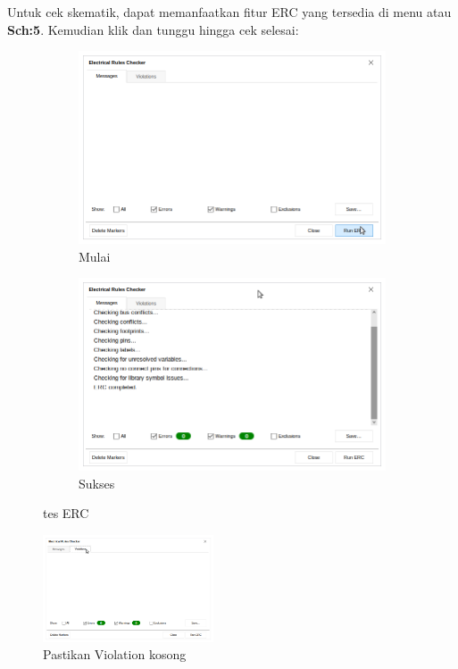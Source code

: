 \documentclass[12pt]{book}
\begin{document}
	Untuk cek skematik, dapat memanfaatkan fitur ERC yang tersedia di menu  atau \textbf{Sch:5}.
	Kemudian klik  dan tunggu hingga cek selesai:
	\begin{figure}[!ht]
		\centering
		\begin{subfigure}[t]{0.45\textwidth}
			\includegraphics[width=\textwidth]{images/sch/erc_0}
			\caption{Mulai}
		\end{subfigure}
		\begin{subfigure}[t]{0.45\textwidth}
			\includegraphics[width=\textwidth]{images/sch/erc_1}
			\caption{Sukses}
		\end{subfigure}
		\caption{tes ERC}
	\end{figure}

	\begin{figure}[!ht]
		\centering
		\includegraphics[width=0.45\textwidth]{images/sch/erc_2}
		\caption{Pastikan Violation kosong}
	\end{figure}
\end{document}
